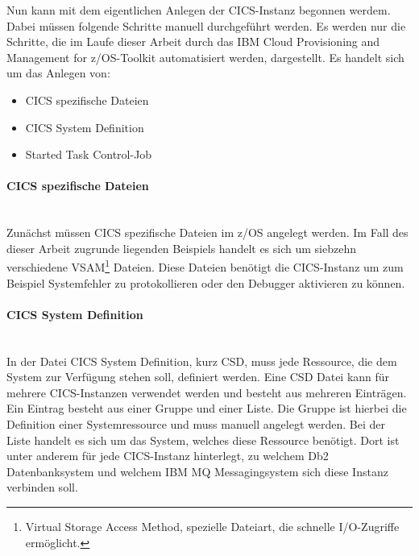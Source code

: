 Nun kann mit dem eigentlichen Anlegen der CICS-Instanz begonnen werdem.
Dabei müssen folgende Schritte manuell durchgeführt werden.
Es werden nur die Schritte, die im Laufe dieser Arbeit durch das \glqq IBM Cloud Provisioning and Management for z/OS\grqq-Toolkit automatisiert werden, dargestellt.
Es handelt sich um das Anlegen von:

\begin{itemize}
\item CICS spezifische Dateien
\item \glqq CICS System Definition\grqq
\item Started Task Control-Job
\end{itemize}

\paragraph{CICS spezifische Dateien}\label{sssec:speziDat} ~\\
Zunächst müssen CICS spezifische Dateien im z/OS angelegt werden.
Im Fall des dieser Arbeit zugrunde liegenden Beispiels handelt es sich um siebzehn verschiedene VSAM\footnote{Virtual Storage Access Method, spezielle Dateiart, die schnelle I/O-Zugriffe ermöglicht.\cite{Lovelace.2013}} Dateien.
Diese Dateien benötigt die CICS-Instanz um zum Beispiel Systemfehler zu protokollieren oder den Debugger aktivieren zu können.

\paragraph{\glqq CICS System Definition\grqq} ~\\
In der Datei \glqq CICS System Definition\grqq, kurz CSD, muss jede Ressource, die dem System zur Verfügung stehen soll, definiert werden.
Eine CSD Datei kann für mehrere CICS-Instanzen verwendet werden und besteht aus mehreren Einträgen.
Ein Eintrag besteht aus einer Gruppe und einer Liste.
Die Gruppe ist hierbei die Definition einer Systemressource und muss manuell angelegt werden.
Bei der Liste handelt es sich um das System, welches diese Ressource benötigt.
Dort ist unter anderem für jede CICS-Instanz hinterlegt, zu welchem Db2 Datenbanksystem und welchem IBM MQ Messagingsystem sich diese Instanz verbinden soll.

